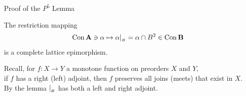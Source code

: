 \begin{frame}[fragile,label=P5Lemma]{Proof of the $P^5$ Lemma}
  \begin{lemma}
The restriction mapping 
\[
\mathrm{Con\,}\mathbf{A} \ni \alpha \mapsto \alpha|_{_B} = \alpha \cap B^2 \in \mathrm{Con\,} \mathbf{B}
\]
is a complete lattice epimorphism. %
  \end{lemma}
\begin{newproof}
  Recall, for $f: X \to Y$ a monotone function on preorders $X$ and $Y$,\\
  if $f$ has a right (left) adjoint, then $f$ preserves all joins (meets)
  that exist in $X$.\\[5pt]
  By the lemma $|_{_B}$ has both a left and right adjoint.
\end{newproof}
\end{frame}













































